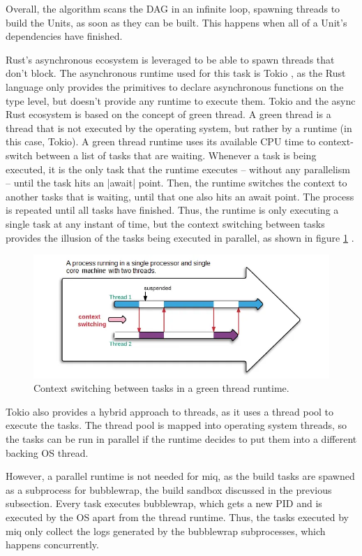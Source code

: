Overall, the algorithm scans the \ac{DAG} in an infinite
loop, spawning threads to build the Units, as soon as
they can be built. This happens when all of a Unit's
dependencies have finished.

Rust's asynchronous ecosystem is leveraged to be able to
spawn threads that don't block. The asynchronous runtime
used for this task is Tokio \cite{TokioRust}, as the Rust
language only provides the primitives to declare
asynchronous functions on the type level, but doesn't
provide any runtime to execute them. Tokio and the async
Rust ecosystem is based on the concept of green thread. A
green thread is a thread that is not executed by the
operating system, but rather by a runtime (in this case,
Tokio). A green thread runtime uses its available CPU time
to context-switch between a list of tasks that are waiting.
Whenever a task is being executed, it is the only task that
the runtime executes -- without any parallelism -- until the
task hits an |await| point. Then, the runtime switches the
context to another tasks that is waiting, until that one
also hits an await point. The process is repeated until all
tasks have finished. Thus, the runtime is only executing a
single task at any instant of time, but the context
switching between tasks provides the illusion of the tasks
being executed in parallel, as shown in figure \ref{fig:timeshare} .

\begin{figure}[hbt]
    \centerfloat
    \includegraphics[width=350pt]{assets/timeshare.png}
    \caption{Context switching between tasks in a green thread runtime.}
    \label{fig:timeshare}
\end{figure}

Tokio also provides a hybrid approach to threads, as it uses
a thread pool to execute the tasks. The thread pool is
mapped into operating system threads, so the tasks can be
run in parallel if the runtime decides to put them into a
different backing \ac{OS} thread.

However, a parallel runtime is not needed for miq, as the
build tasks are spawned as a subprocess for bubblewrap, the
build sandbox discussed in the previous subsection. Every
task executes bubblewrap, which gets a new \acl{PID} and is
executed by the OS apart from the thread runtime. Thus, the
tasks executed by miq only collect the logs generated by the
bubblewrap subprocesses, which happens concurrently.


